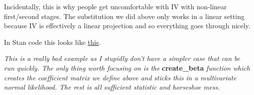\documentclass{article}
\begin{document}
Incidentally, this is why people get uncomfortable with IV with non-linear first/second 
stages. The substitution we did above only works in a linear setting because IV 
is effectively a linear projection and so everything goes through nicely.


In Stan code this looks like \href{https://gist.github.com/EdJeeOnGitHub/f728ac156da2d8dafa4dda8cd1a6b336}{this}.

\textit{This is a really bad example as I stupidly don't have a simpler case that 
can be run quickly. The only 
thing worth focusing on is the } \textbf{create\_beta} \textit{function which creates the  
coefficient matrix we define above and sticks this in a multivariate normal 
likelihood. The rest is all sufficient statistic and horseshoe mess.}
\end{document}
